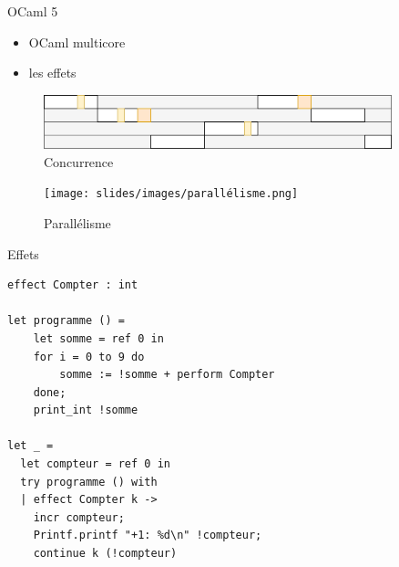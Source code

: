 

\begin{frame}{OCaml 5}

    \begin{itemize}[label=\small{}]
        \item OCaml multicore
        \item les effets 
    \end{itemize}
\pause

\begin{figure}
    \centering
    \includegraphics[width=0.9\textwidth]{slides/images/concurrence.png}
    \caption{Concurrence}
\end{figure}

\begin{figure}
    \centering
    \texttt{[image: slides/images/parallélisme.png]}
    \caption{Parallélisme}
\end{figure}
\end{frame}

\begin{frame}[fragile]{Effets}

\begin{lstlisting}
effect Compter : int

let programme () =
    let somme = ref 0 in
    for i = 0 to 9 do
        somme := !somme + perform Compter
    done;
    print_int !somme

let _ =
  let compteur = ref 0 in
  try programme () with
  | effect Compter k -> 
    incr compteur;
    Printf.printf "+1: %d\n" !compteur;
    continue k (!compteur)
\end{lstlisting}

    
\end{frame}